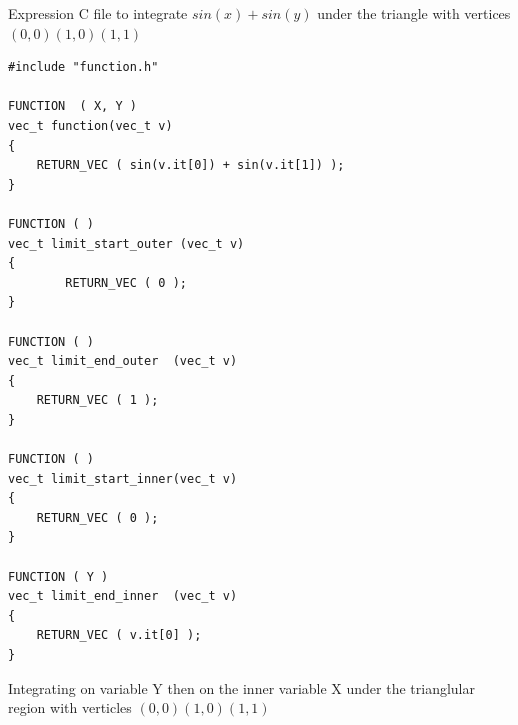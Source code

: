 \documentclass[12pt]{article}
\begin{document}
\begin{flushleft}
Expression C file to integrate $sin(x) + sin(y)$ under the triangle with vertices $(0, 0) (1, 0) (1, 1)$
\end{flushleft}

\begin{lstlisting}
#include "function.h"

FUNCTION  ( X, Y )
vec_t function(vec_t v)
{
	RETURN_VEC ( sin(v.it[0]) + sin(v.it[1]) );
}

FUNCTION ( )
vec_t limit_start_outer (vec_t v)
{
       	RETURN_VEC ( 0 );
}

FUNCTION ( )
vec_t limit_end_outer  (vec_t v)
{
	RETURN_VEC ( 1 );
}

FUNCTION ( )
vec_t limit_start_inner(vec_t v)
{
	RETURN_VEC ( 0 );
}

FUNCTION ( Y )
vec_t limit_end_inner  (vec_t v)
{
	RETURN_VEC ( v.it[0] );
}
\end{lstlisting}

\begin{flushleft}
	Integrating on variable Y then on the inner variable X under the trianglular region with verticles $(0, 0) (1, 0) (1, 1)$
\end{flushleft}
\end{document}
